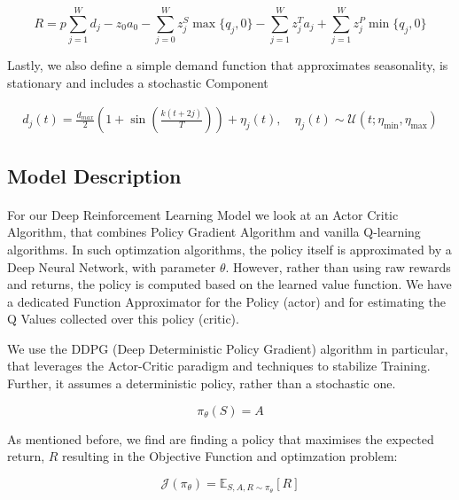 \documentclass{article}
\begin{document}
\begin{equation}
    R = p\sum_{j = 1}^Wd_j - z_0a_0 - \sum_{j = 0}^W z_j^S \max \{q_j, 0 \} - \sum_{j = 1}^W z_j^Ta_j + \sum_{j = 1}^Wz_j^P \min \{q_j, 0 \}
\end{equation}

Lastly, we also define a simple demand function that approximates seasonality, is stationary and includes a stochastic Component

\begin{equation}
    \begin{split}
        d_j(t) = \frac{d_{max}}{2} (1 + \sin(\frac{k (t + 2j)}{T})) + \eta_j(t), \quad
        \eta_j(t) \sim \mathcal{U}(t; \eta_{\min}, \eta_{\max})
    \end{split} 
\end{equation}


\subsection{Model Description}

\paragraph{}
For our Deep Reinforcement Learning Model we look at an Actor Critic Algorithm, that combines Policy Gradient Algorithm and vanilla Q-learning algorithms.  In such optimzation algorithms, the policy itself is approximated by a Deep Neural Network, with parameter \(\theta\). However, rather than using raw rewards and returns, the policy is computed based on the learned value function. We have a dedicated Function Approximator for the Policy (actor) and for estimating the Q Values collected over this policy (critic). 

We use the DDPG (Deep Deterministic Policy Gradient) algorithm in particular, that leverages the Actor-Critic paradigm and techniques to stabilize Training. Further, it assumes a deterministic policy, rather than a stochastic one.

\[ \pi_{\theta}(S) = A \]

As mentioned before, we find are finding a policy that maximises the expected return, \(R\) resulting in the Objective Function and optimzation problem: 

\begin{equation} 
    \mathcal{J}(\pi_{\theta}) = \mathbb{E}_{S, A, R \sim \pi_{\theta}} \left[ R \right] \end{equation}
\end{document}
